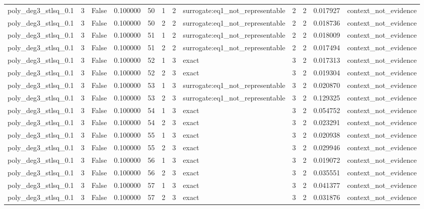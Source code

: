 \begin{tabular}{lrrrrrrlrrrl}
poly\_deg3\_stlsq\_0.1 & 3 & False & 0.100000 & 50 & 1 & 2 & surrogate:eq1\_not\_representable & 2 & 2 & 0.017927 & context\_not\_evidence \\
poly\_deg3\_stlsq\_0.1 & 3 & False & 0.100000 & 50 & 2 & 2 & surrogate:eq1\_not\_representable & 2 & 2 & 0.018736 & context\_not\_evidence \\
poly\_deg3\_stlsq\_0.1 & 3 & False & 0.100000 & 51 & 1 & 2 & surrogate:eq1\_not\_representable & 2 & 2 & 0.018009 & context\_not\_evidence \\
poly\_deg3\_stlsq\_0.1 & 3 & False & 0.100000 & 51 & 2 & 2 & surrogate:eq1\_not\_representable & 2 & 2 & 0.017494 & context\_not\_evidence \\
poly\_deg3\_stlsq\_0.1 & 3 & False & 0.100000 & 52 & 1 & 3 & exact & 3 & 2 & 0.017313 & context\_not\_evidence \\
poly\_deg3\_stlsq\_0.1 & 3 & False & 0.100000 & 52 & 2 & 3 & exact & 3 & 2 & 0.019304 & context\_not\_evidence \\
poly\_deg3\_stlsq\_0.1 & 3 & False & 0.100000 & 53 & 1 & 3 & surrogate:eq1\_not\_representable & 3 & 2 & 0.020870 & context\_not\_evidence \\
poly\_deg3\_stlsq\_0.1 & 3 & False & 0.100000 & 53 & 2 & 3 & surrogate:eq1\_not\_representable & 3 & 2 & 0.129325 & context\_not\_evidence \\
poly\_deg3\_stlsq\_0.1 & 3 & False & 0.100000 & 54 & 1 & 3 & exact & 3 & 2 & 0.054752 & context\_not\_evidence \\
poly\_deg3\_stlsq\_0.1 & 3 & False & 0.100000 & 54 & 2 & 3 & exact & 3 & 2 & 0.023291 & context\_not\_evidence \\
poly\_deg3\_stlsq\_0.1 & 3 & False & 0.100000 & 55 & 1 & 3 & exact & 3 & 2 & 0.020938 & context\_not\_evidence \\
poly\_deg3\_stlsq\_0.1 & 3 & False & 0.100000 & 55 & 2 & 3 & exact & 3 & 2 & 0.029946 & context\_not\_evidence \\
poly\_deg3\_stlsq\_0.1 & 3 & False & 0.100000 & 56 & 1 & 3 & exact & 3 & 2 & 0.019072 & context\_not\_evidence \\
poly\_deg3\_stlsq\_0.1 & 3 & False & 0.100000 & 56 & 2 & 3 & exact & 3 & 2 & 0.035551 & context\_not\_evidence \\
poly\_deg3\_stlsq\_0.1 & 3 & False & 0.100000 & 57 & 1 & 3 & exact & 3 & 2 & 0.041377 & context\_not\_evidence \\
poly\_deg3\_stlsq\_0.1 & 3 & False & 0.100000 & 57 & 2 & 3 & exact & 3 & 2 & 0.031876 & context\_not\_evidence \\

\end{tabular}
